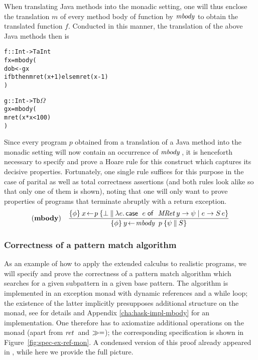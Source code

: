 \begin{expl}
When translating Java methods into the monadic setting, one will thus enclose
the translation $m$ of every method body  of function  by
$\mathit{mbody}$ to obtain the translated function $f$. Conducted in this manner,
the translation of the above Java methods then is
\begin{alltt}
f :: Int -> T a Int
f x = mbody (
      do b <- g x
         if b then mret (x+1) else mret (x-1)
      )

g :: Int -> T b \(\Omega\)
g x = mbody (
      mret (x * x < 100)
      )
\end{alltt}
\end{expl}

Since every program $p$ obtained from a translation of a Java method into the
monadic setting will now contain an occurrence of $\mathit{mbody}\,$, it is henceforth
necessary to specify and prove a Hoare rule for this construct which captures
its decisive properties. Fortunately, one single rule suffices for this purpose
in the case of parital as well as total correctness assertions (and both rules
look alike so that only one of them is shown), noting that one will only want to
prove properties of programs that terminate abruptly with a return exception.
\[
    \NRule{mbody}
    {\EPHTriple{\phi}{x\leteq p}{\bot}{\LambdaTerm{e}{\Case\ e\Of\ \op{MRet}\,y \to \psi
          \Alt e \to S\,e}}}
    {\EPHTriple{\phi}{y\leteq \mbody\ p}{\psi}{S}}
\]

\subsubsection{Correctness of a pattern match algorithm}
\label{sec:corr-patt-match}

As an example of how to apply the extended calculus to realistic programs, we
will specify and prove the correctness of a pattern match algorithm which
searches for a given subpattern in a given base pattern.  The algorithm is
implemented in an exception monad with dynamic references and a while loop; the
existence of the latter implicitly presupposes additional structure on the
monad, see 
\cite[Section 7] {SchroederMossakowski:PDL} for details and Appendix \ref{cha:hask-impl-mbody}
for an implementation. One therefore has to axiomatize additional operations on
the monad (apart from $\mathit{ret\,}$ and $\gg=$); the corresponding specification is
shown in Figure~\ref{fig:spec-ex-ref-mon}.  A condensed version of this proof
already appeared in \cite{WalterEA05}, while here we provide the full picture.

